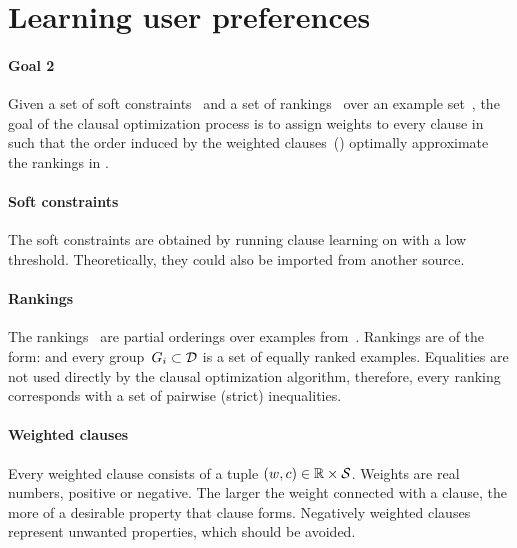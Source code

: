 
\section{Learning user preferences}
\label{sec:learning_user_preferences}

\begin{framed}
	\noindent
	\begin{minipage}{\textwidth}
		\paragraph{Goal 2}
		Given a set of soft constraints~ and a set of rankings~ over an example set~, the goal of the clausal optimization process is to assign weights to every clause in~ such that the order induced by the weighted clauses~() optimally approximate the rankings in .
	\end{minipage}
\end{framed}

\paragraph{Soft constraints}
The soft constraints are obtained by running clause learning on  with a low threshold.
Theoretically, they could also be imported from another source.

\paragraph{Rankings}
The rankings~ are partial orderings over examples from~.
Rankings are of the form:  and every group~$G_i \subset \mathcal{D}$ is a set of equally ranked examples. Equalities are not used directly by the clausal optimization algorithm, therefore, every ranking corresponds with a set of pairwise (strict) inequalities.

\paragraph{Weighted clauses}
Every weighted clause consists of a tuple $(w, c) \in \mathbb{R} \times \mathcal{S}$.
Weights are real numbers, positive or negative.
The larger the weight connected with a clause, the more of a desirable property that clause forms.
Negatively weighted clauses represent unwanted properties, which should be avoided.

